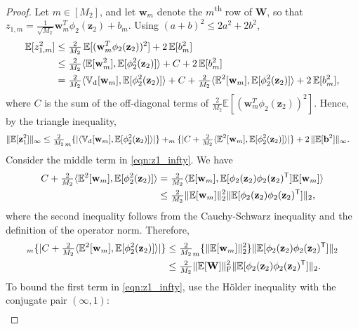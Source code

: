 \documentclass[twoside]{article}
\renewcommand{\ss}[1]{_{\text{#1}}}
\newcommand{\vb}{\mathbf{b}}
\newcommand{\vw}{\mathbf{w}}
\newcommand{\vz}{\mathbf{z}}
\newcommand{\mW}{\mathbf{W}}
\newcommand{\E}{\mathbb{E}}
\newcommand{\V}{\mathbb{V}}
\newcommand{\T}{\text{\textsf{T}}}
\newcommand{\opspace}{}
\let\max\relax\DeclareMathOperator*{\max}{max\opspace}
\renewcommand{\ss}[1]{_{\text{#1}}}        %
\DeclarePairedDelimiter\lra{\langle}{\rangle}    %
\DeclarePairedDelimiter\norm{\|}{\|}             %
\DeclarePairedDelimiter\abs{|}{|}                %
\theoremstyle{theoremstyle}
\begin{document}
\begin{proof}
    Let $m \in [M_2]$, and let $\vw_m$ denote the $m$\textsuperscript{th} row of $\mW$, so that $z_{1,m}=\tfrac{1}{\sqrt{M_2}}\vw_m^T\phi_2(\vz_2) + b_m$. Using $(a + b)^2\le 2a^2 + 2b^2$,
    \begin{align}
        \E[z_{1,m}^2]
        &\le \tfrac2{M_2}\,\E[(\vw_m^T \phi_2(\vz_2))^2] + 2\,\E[b_{m}^2] \\
        &\le \tfrac2{M_2} \lra{\E[\vw_m^2], \E[\phi_2^2(\vz_{2})]} + C + 2\,\E[b_{m}^2] \\
        &= \tfrac2{M_2} \lra{\V\ss{d}[\vw_m], \E[\phi_2^2(\vz_{2})]} + C + \tfrac2{M_2} \lra{\E^2[\vw_m], \E[\phi_2^2(\vz_{2})]}  + 2\,\E[b_{m}^2],
    \end{align}
    where $C$ is the sum of the off-diagonal terms of $\tfrac2{M_2}\E[(\vw_m^T \phi_2(\vz_2))^2]$. 
    Hence, by the triangle inequality,
    \begin{align}
        \norm{\E[\vz_1^2]}_\infty
        &\le \tfrac2{M_2} \max_m \{\abs{\lra{\V\ss{d}[\vw_m], \E[\phi_2^2(\vz_{2})]}} \} + \max_m \{\abs{C + \tfrac2{M_2} \lra{\E^2[\vw_m], \E[\phi_2^2(\vz_{2})]}}\} + 2\, \norm{\E[\vb^2]}_\infty. \label{eqn:z1_infty}
    \end{align}
    Consider the middle term in \cref{eqn:z1_infty}. We have
    \begin{align}
        C + \tfrac2{M_2} \lra{\E^2[\vw_m], \E[\phi_2^2(\vz_{2})]}
        &= \tfrac2{M_2} \lra{\E[\vw_m], \E[\phi_2(\vz_{2})\phi_2(\vz_{2})^\T] \E[\vw_m]} \\
        &\le \tfrac2{M_2} \norm{\E[\vw_m]}_2^2 \norm{\E[\phi_2(\vz_{2})\phi_2(\vz_{2})^\T]}_2,
    \end{align}
    where the second inequality follows from the Cauchy-Schwarz inequality and the definition of the operator norm. Therefore,
    \begin{align}
        \max_m \{ \abs{C + \tfrac2{M_2} \lra{\E^2[\vw_m], \E[\phi_2^2(\vz_{2})]} } \}
        &\le \tfrac2{M_2} \max_m \{ \norm{\E[\vw_m]}_2^2 \} \norm{\E[\phi_2(\vz_{2})\phi_2(\vz_{2})^\T]}_2 \\
        &\le \tfrac2{M_2} \norm{\E[\mW]}\ss{F}^2 \norm{\E[\phi_2(\vz_{2})\phi_2(\vz_{2})^\T]}_2.
    \end{align}
    To bound the first term in \cref{eqn:z1_infty}, use the H{\"o}lder inequality with the conjugate pair $(\infty, 1)$:
    \begin{align}

\end{align}
\end{proof}
\end{document}
